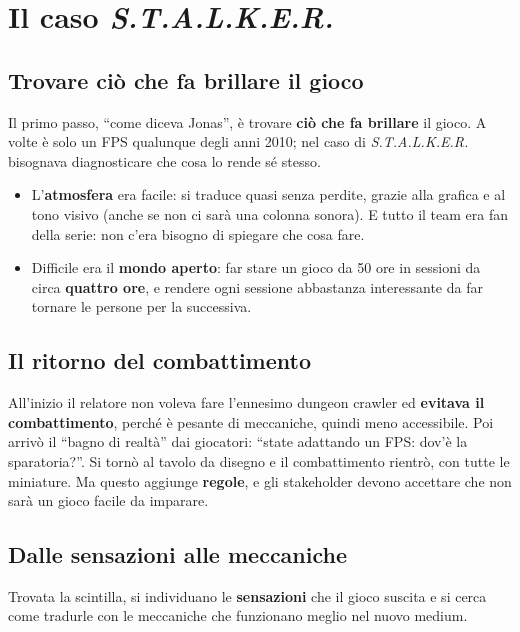 \section{Il caso \emph{S.T.A.L.K.E.R.}}
\label{sec:c3-5-stalker}

\subsection{Trovare ciò che fa brillare il gioco}

Il primo passo, ``come diceva Jonas'', è trovare \textbf{ciò che fa brillare} il
gioco. A volte è solo un FPS qualunque degli anni 2010; nel caso di
\emph{S.T.A.L.K.E.R.} bisognava diagnosticare che cosa lo rende sé stesso.
\begin{itemize}
  \item L'\textbf{atmosfera} era facile: si traduce quasi senza perdite, grazie
        alla grafica e al tono visivo (anche se non ci sarà una colonna sonora). E
        tutto il team era fan della serie: non c'era bisogno di spiegare che cosa
        fare.
  \item Difficile era il \textbf{mondo aperto}: far stare un gioco da 50 ore in
        sessioni da circa \textbf{quattro ore}, e rendere ogni sessione abbastanza
        interessante da far tornare le persone per la successiva.
\end{itemize}

\subsection{Il ritorno del combattimento}

All'inizio il relatore non voleva fare l'ennesimo dungeon crawler ed
\textbf{evitava il combattimento}, perché è pesante di meccaniche, quindi meno
accessibile. Poi arrivò il ``bagno di realtà'' dai giocatori: ``state adattando un
FPS: dov'è la sparatoria?''. Si tornò al tavolo da disegno e il combattimento rientrò,
con tutte le miniature. Ma questo aggiunge \textbf{regole}, e gli stakeholder devono
accettare che non sarà un gioco facile da imparare.

\subsection{Dalle sensazioni alle meccaniche}

Trovata la scintilla, si individuano le \textbf{sensazioni} che il gioco suscita e
si cerca come tradurle con le meccaniche che funzionano meglio nel nuovo medium.

